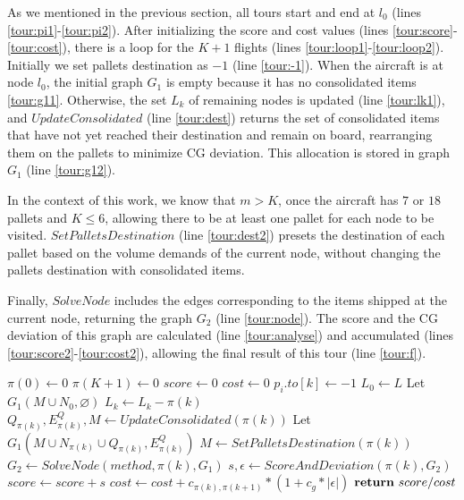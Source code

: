 \documentclass[preprint,authoryear]{elsarticle}
\begin{document}
As we mentioned in the previous section, all tours start and end at $l_0$\/ (lines \ref{tour:pi1}-\ref{tour:pi2}).
After initializing the score and cost values (lines \ref{tour:score}-\ref{tour:cost}), there is a loop for the $K+1$\/ flights (lines \ref{tour:loop1}-\ref{tour:loop2}). Initially we set pallets destination as $-1$\/ (line \ref{tour:-1}). When the aircraft is at node $l_0$, the initial graph $G_1$\/ is empty because it has no consolidated items \ref{tour:g11}. Otherwise, the set $L_k$\/ of remaining nodes is updated (line \ref{tour:lk1}), and $UpdateConsolidated$\/ (line \ref{tour:dest}) returns the set of consolidated items that have not yet reached their destination and remain on board, rearranging them on the pallets to minimize CG deviation. This allocation is stored in graph $G_1$\/ (line \ref{tour:g12}).

In the context of this work, we know that $m>K$, once the aircraft has $7$\/ or $18$\/ pallets and $K\leq 6$, allowing there to be at least one pallet for each node to be visited. $SetPalletsDestination$\/ (line \ref{tour:dest2}) presets the destination of each pallet based on the volume demands of the current node, without changing the pallets destination with consolidated items.

Finally, $SolveNode$\/ includes the edges corresponding to the items shipped at the current node, returning the graph $G_2$\/ (line \ref{tour:node}). The score and the CG deviation of this graph are calculated (line \ref{tour:analyse}) and accumulated (lines \ref{tour:score2}-\ref{tour:cost2}), allowing the final result of this tour (line \ref{tour:f}).

\begin{algorithm}[H]
	\caption{$SolveTour(\pi, L, M, C, N, method)$}  \label{alg:tour}
	
	\begin{algorithmic}[1]
		
		\State $\pi(0) \gets 0$ \label{tour:pi1}
		\State $\pi(K+1) \gets 0$ \label{tour:pi2}
		\State $score \gets 0$ \label{tour:score}
		\State $cost \gets 0$ \label{tour:cost}
		 \label{tour:loop1}		
				\State $p_i.to[k] \gets -1$ \label{tour:-1}
			\EndFor	
				\State $L_0 \gets L$
				\State Let $G_1(M \cup N_0, \varnothing)$ \label{tour:g11}
			\Else
				\State $L_k \gets L_k - \pi(k)$  \label{tour:lk1}			
				\State $Q_{\pi(k)}, E^Q_{\pi(k)}, M \gets UpdateConsolidated(\pi(k))$ \label{tour:dest}			
				\State Let $G_1(M \cup N_{\pi(k)} \cup Q_{\pi(k)}, E^Q_{\pi(k)})$ \label{tour:g12}
			\EndIf  \label{tour:lk2}	
			\State $M \gets SetPalletsDestination( \pi(k) )$ \label{tour:dest2}		
			\State $G_2 \gets SolveNode(method, \pi(k), G_1)$ \label{tour:node}
			\State $s, \epsilon \gets ScoreAndDeviation(\pi(k), G_2)$ \label{tour:analyse}
			\State $score \gets score + s$ \label{tour:score2}
			\State $cost \gets cost + c_{\pi(k),\pi(k+1)} * (1 + c_g * |\epsilon|)$ \label{tour:cost2} 
		\EndFor  \label{tour:loop2}
		\State $ {\bf return}\ score / cost$ \label{tour:f}
		
	\end{algorithmic}
\end{algorithm}
\end{document}
